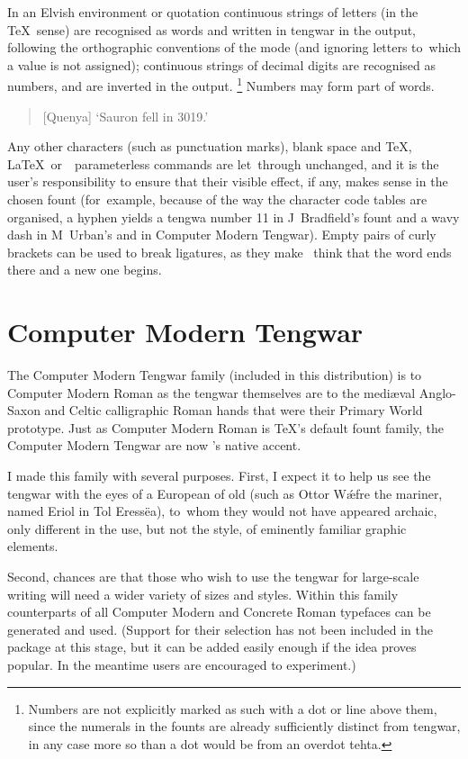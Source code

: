 \documentclass{article}
\newif \ifcmteng \cmtengtrue
\newcommand\quet[1]{%
  \ifcmteng \underline {\quetta{#1}}\else \quetta{#1}\fi}
\newcommand\queng[1]{{\tt#1} \quet{#1}}
\begin{document}
In an Elvish environment or quotation continuous strings of letters
(in the \TeX\ sense) are recognised as words and written in tengwar in
the output, following the orthographic conventions of the mode (and
ignoring letters to~which a value is not assigned); continuous strings
of decimal digits are recognised as numbers, and are inverted in the output.%
\footnote{Numbers are not explicitly marked as such with a dot or line
  above them, since the numerals in the founts are already sufficiently
  distinct from tengwar, in any case more so than a dot would be from
  an overdot tehta.}
%
Numbers may form part of words.
%
\begin{quote}
\quenya\queng{\lightvocalise Sauron ataltane 3019sse.}

[Quenya] `Sauron fell in 3019.'
\end{quote}
%
Any other characters (such as punctuation marks), blank space and
\TeX, \LaTeX\ or~\TengTeX\ parameterless commands are let~through
unchanged, and it is the user's respons\-ibility to ensure that their
visible effect, if any, makes sense in the chosen fount (for~example,
because of the way the character code tables are organised,
a hyphen yields a tengwa number 11 in J~Bradfield's fount
and a wavy dash in M~Urban's and in Computer Modern Tengwar).
Empty pairs of curly brackets can be used to break ligatures,
as they make \TengTeX\ think that the word ends there
and a new one begins.

\section{Computer Modern Tengwar}

The Computer Modern Tengwar family (included in this distribution)
is to Computer Modern Roman as the tengwar themselves are
to the medi\ae val Anglo-Saxon and Celtic calligraphic
Roman hands that were their Primary World prototype.
Just as Computer Modern Roman is \TeX's default fount family,
the Computer Modern Tengwar are now \TengTeX's native accent.

I made this family with several purposes.
First, I expect it to help us see the tengwar with the eyes
of a European of old (such as Ottor W\'\ae fre the mariner,
named Eriol in Tol Eress\"ea),
to~whom they would not have appeared archaic, only different
in the use, but not the style, of eminently familiar graphic
elements.

Second, chances are that those who wish to use the tengwar for
large-scale writing will need a wider variety of sizes and styles.
Within this family counterparts of all Computer Modern
and Concrete Roman typefaces can be generated and used.
(Support for their selection has not been included in the
package at this stage, but it can be added easily enough
if the idea proves popular. In the meantime users are
encouraged to experiment.)
\end{document}
